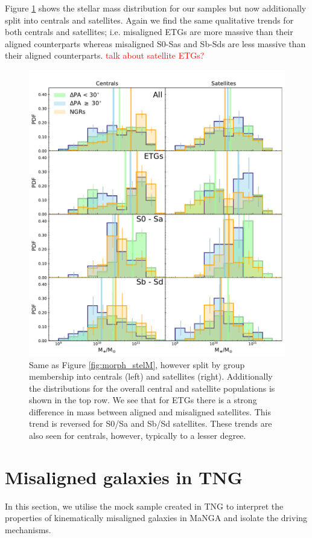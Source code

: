 \documentclass[fleqn,usenatbib]{mnras}
\newcommand{\red}[1]{{\textcolor{red}{#1}}}
\begin{document}
Figure \ref{fig:group_morph_stelM} shows the stellar mass distribution for our samples but now additionally split into centrals and satellites. Again we find the same qualitative trends for both centrals and satellites; i.e. misaligned ETGs are more massive than their aligned counterparts whereas misaligned S0-Sas and Sb-Sds are less massive than their aligned counterparts. \red{talk about satellite ETGs?}

\begin{figure}
	\includegraphics[width=\linewidth]{cen_sat/delPA_stelM_morph_lim.pdf}
    \caption{Same as Figure \ref{fig:morph_stelM}, however split by group membership into centrals (left) and satellites (right). Additionally the distributions for the overall central and satellite populations is shown in the top row. We see that for ETGs there is a strong difference in mass between aligned and misaligned satellites. This trend is reversed for S0/Sa and Sb/Sd satellites. These trends are also seen for centrals, however, typically to a lesser degree.}
    \label{fig:group_morph_stelM}
\end{figure}

\section{Misaligned galaxies in TNG} \label{sec:tng_results}
In this section, we utilise the mock sample created in TNG to interpret the properties of kinematically misaligned galaxies in MaNGA and isolate the driving mechanisms. 
\end{document}
